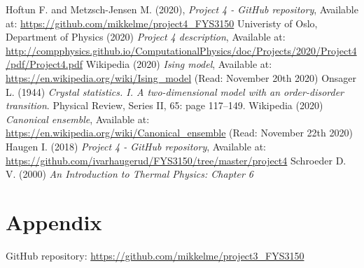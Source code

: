\documentclass[%
 reprint,
nofootinbib,
aps,
]{revtex4-1}
\begin{document}
\begin{thebibliography}{}
 Hoftun F. and Metzsch-Jensen M. (2020), \textit{Project 4 - GitHub repository}, Available at: \url{https://github.com/mikkelme/project4_FYS3150}
 Univeristy of Oslo, Department of Physics (2020) \textit{Project 4 description}, Available at: \url{http://compphysics.github.io/ComputationalPhysics/doc/Projects/2020/Project4/pdf/Project4.pdf}
 Wikipedia (2020) \textit{Ising model}, Available at: \url{https://en.wikipedia.org/wiki/Ising_model} (Read: November 20th 2020)
 Onsager L. (1944) \textit{Crystal statistics. I. A two-dimensional model with an order-disorder transition}.  Physical Review, Series II, 65: page 117–149.
 Wikipedia (2020) \textit{Canonical ensemble}, Available at: \url{https://en.wikipedia.org/wiki/Canonical_ensemble} (Read: November 22th 2020)
 Haugen I. (2018) \textit{Project 4 - GitHub repository}, Available at: \url{https://github.com/ivarhaugerud/FYS3150/tree/master/project4}
 Schroeder D. V. (2000) \textit{An Introduction to Thermal Physics: Chapter 6}
\end{thebibliography}




%

\clearpage
\section*{Appendix}
GitHub repository: \url{https://github.com/mikkelme/project3_FYS3150}
\end{document}
